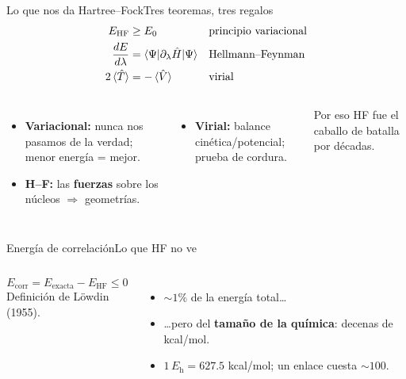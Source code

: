 \documentclass[aspectratio=169]{beamer}
\newcommand{\cplx}[1]{{\footnotesize\color{cookieMuted}#1}}
\newcommand{\Eh}{E_\mathrm{h}}
\begin{document}
\begin{frame}{Lo que nos da Hartree--Fock}{Tres teoremas, tres regalos}
  \begin{align*}
    E_\mathrm{HF}&\ge E_0 && \text{principio variacional} \\
    \frac{dE}{d\lambda}&=\braket{\Psi|\partial_\lambda\hat H|\Psi} && \text{Hellmann--Feynman} \\
    2\braket{\hat T}&=-\braket{\hat V} && \text{virial}
  \end{align*}
  \begin{columns}[T,onlytextwidth]
      \begin{itemize}\setlength\itemsep{3pt}
        \item \textbf{Variacional:} nunca nos pasamos de la verdad; menor energía = mejor.
        \item \textbf{H--F:} las \textbf{fuerzas} sobre los núcleos $\Rightarrow$ geometrías.
      \end{itemize}
      \begin{itemize}\setlength\itemsep{3pt}
        \item \textbf{Virial:} balance cinética/potencial; prueba de cordura.
      \end{itemize}
      \cplx{Por eso HF fue el caballo de batalla por décadas.}
  \end{columns}
\end{frame}

\begin{frame}{Energía de correlación}{Lo que HF no ve}
  \begin{columns}[T,onlytextwidth]
      \[ E_\mathrm{corr}=E_\mathrm{exacta}-E_\mathrm{HF}\le 0 \]
      \cplx{Definición de Löwdin (1955).}
      \begin{itemize}\setlength\itemsep{4pt}
        \item $\sim\!1\%$ de la energía total\ldots
        \item \ldots pero del \textbf{tamaño de la química}: decenas de kcal/mol.
        \item $1\,\Eh = 627.5$ kcal/mol; un enlace cuesta $\sim\!100$.
      \end{itemize}
      \centering
  \end{columns}
\end{frame}
\end{document}
